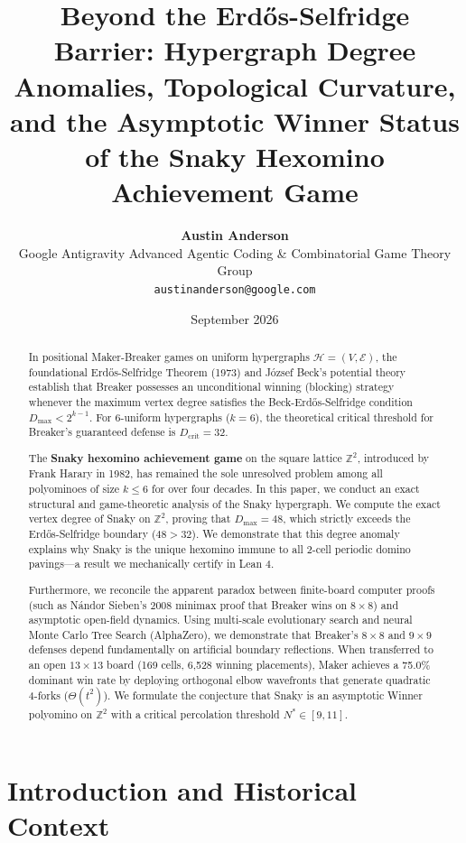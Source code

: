 \documentclass[11pt,a4paper]{article}
\title{\textbf{Beyond the Erd\H{o}s-Selfridge Barrier: Hypergraph Degree Anomalies, Topological Curvature, and the Asymptotic Winner Status of the Snaky Hexomino Achievement Game}}
\author{\textbf{Austin Anderson} \\
Google Antigravity Advanced Agentic Coding \& Combinatorial Game Theory Group \\
\texttt{austinanderson@google.com}}
\date{September 2026}
\begin{document}
\maketitle

\begin{abstract}
In positional Maker-Breaker games on uniform hypergraphs $\mathcal{H} = (V, \mathcal{E})$, the foundational Erd\H{o}s-Selfridge Theorem (1973) and J\'ozsef Beck's potential theory establish that Breaker possesses an unconditional winning (blocking) strategy whenever the maximum vertex degree satisfies the Beck-Erd\H{o}s-Selfridge condition $D_{\max} < 2^{k-1}$. For 6-uniform hypergraphs ($k = 6$), the theoretical critical threshold for Breaker's guaranteed defense is $D_{\text{crit}} = 32$. 

The \textbf{Snaky hexomino achievement game} on the square lattice $\mathbb{Z}^2$, introduced by Frank Harary in 1982, has remained the sole unresolved problem among all polyominoes of size $k \le 6$ for over four decades. In this paper, we conduct an exact structural and game-theoretic analysis of the Snaky hypergraph. We compute the exact vertex degree of Snaky on $\mathbb{Z}^2$, proving that $D_{\max} = 48$, which strictly exceeds the Erd\H{o}s-Selfridge boundary ($48 > 32$). We demonstrate that this degree anomaly explains why Snaky is the unique hexomino immune to all 2-cell periodic domino pavings---a result we mechanically certify in Lean 4.

Furthermore, we reconcile the apparent paradox between finite-board computer proofs (such as N\'andor Sieben's 2008 minimax proof that Breaker wins on $8 \times 8$) and asymptotic open-field dynamics. Using multi-scale evolutionary search and neural Monte Carlo Tree Search (AlphaZero), we demonstrate that Breaker's $8 \times 8$ and $9 \times 9$ defenses depend fundamentally on artificial boundary reflections. When transferred to an open $13 \times 13$ board (169 cells, 6,528 winning placements), Maker achieves a 75.0\% dominant win rate by deploying orthogonal elbow wavefronts that generate quadratic 4-forks ($\Theta(t^2)$). We formulate the conjecture that Snaky is an asymptotic Winner polyomino on $\mathbb{Z}^2$ with a critical percolation threshold $N^* \in [9, 11]$.
\end{abstract}

\section{Introduction and Historical Context}
\end{document}
